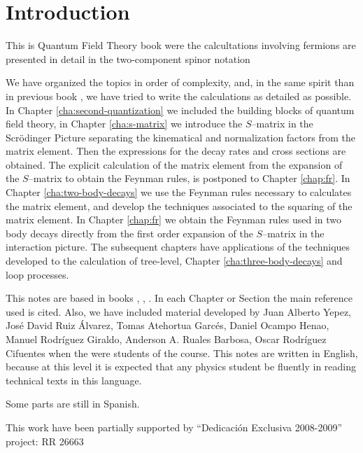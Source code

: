 
\chapter*{Introduction}
\label{cha:introduction} %


This is Quantum Field Theory book were the calcultations involving fermions are presented in detail in the two-component spinor notation~\cite{Kersch:1985rn,Dreiner:2008tw}

We have organized the topics in order of complexity, and, in the same
spirit than in  previous book \cite{lsm}, we have tried to write the
calculations as detailed as possible. In
Chapter 
\ref{cha:second-quantization} %
we included the building blocks
of quantum field theory, in Chapter 
\ref{cha:s-matrix} %
we introduce
the $S$--matrix in the Scr\"odinger Picture separating the kinematical
and normalization factors from the matrix element. Then the expressions
for the decay rates and cross sections are obtained. The explicit
calculation of the matrix element from the expansion of the
$S$--matrix to obtain the Feynman rules, is postponed to Chapter
\ref{chap:fr}. %
In Chapter 
\ref{cha:two-body-decays} %
we use the Feynman
rules necessary to calculates the matrix element, and develop the
techniques associated to the squaring of the matrix element. In
Chapter 
\ref{chap:fr} %
we obtain the Feynman rules used in two body
decays directly from the first order expansion of the $S$--matrix in
the interaction picture. The subsequent chapters have applications of
the techniques developed to the calculation of tree-level, 
Chapter 
\ref{cha:three-body-decays} %
and loop processes.


This notes are based in books \cite{Maggiore:2005qv}, \cite{Mandl:1985bg}, \cite{Lahiri:2005sm}.  In each Chapter or Section the main reference used is cited. Also, we have included material developed by Juan Alberto Yepez, José David Ruiz Álvarez,
Tomas Atehortua Garcés,
Daniel Ocampo Henao,
Manuel Rodríguez Giraldo,
Anderson A. Ruales Barbosa,
Oscar Rodríguez Cifuentes
when the were students of the course. This notes are written in English, because at this level it is expected that any physics student be fluently in reading technical texts in this language.

Some parts are still in Spanish. 

This work have been partially supported by ``Dedicaci\'on Exclusiva 2008-2009''  project: RR 26663


